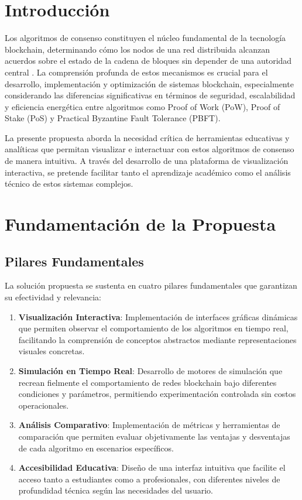 \documentclass[spanish,12pt,letterpaper]{report}
\begin{document}
\newpage

\section{Introducción}

Los algoritmos de consenso constituyen el núcleo fundamental de la tecnología blockchain, determinando cómo los nodos de una red distribuida alcanzan acuerdos sobre el estado de la cadena de bloques sin depender de una autoridad central \cite{nakamoto2008bitcoin}. La comprensión profunda de estos mecanismos es crucial para el desarrollo, implementación y optimización de sistemas blockchain, especialmente considerando las diferencias significativas en términos de seguridad, escalabilidad y eficiencia energética entre algoritmos como Proof of Work (PoW), Proof of Stake (PoS) y Practical Byzantine Fault Tolerance (PBFT).

La presente propuesta aborda la necesidad crítica de herramientas educativas y analíticas que permitan visualizar e interactuar con estos algoritmos de consenso de manera intuitiva. A través del desarrollo de una plataforma de visualización interactiva, se pretende facilitar tanto el aprendizaje académico como el análisis técnico de estos sistemas complejos.

\section{Fundamentación de la Propuesta}

\subsection{Pilares Fundamentales}

La solución propuesta se sustenta en cuatro pilares fundamentales que garantizan su efectividad y relevancia:

\begin{enumerate}
    \item \textbf{Visualización Interactiva}: Implementación de interfaces gráficas dinámicas que permiten observar el comportamiento de los algoritmos en tiempo real, facilitando la comprensión de conceptos abstractos mediante representaciones visuales concretas.
    
    \item \textbf{Simulación en Tiempo Real}: Desarrollo de motores de simulación que recrean fielmente el comportamiento de redes blockchain bajo diferentes condiciones y parámetros, permitiendo experimentación controlada sin costos operacionales.
    
    \item \textbf{Análisis Comparativo}: Implementación de métricas y herramientas de comparación que permiten evaluar objetivamente las ventajas y desventajas de cada algoritmo en escenarios específicos.
    
    \item \textbf{Accesibilidad Educativa}: Diseño de una interfaz intuitiva que facilite el acceso tanto a estudiantes como a profesionales, con diferentes niveles de profundidad técnica según las necesidades del usuario.
\end{enumerate}
\end{document}
